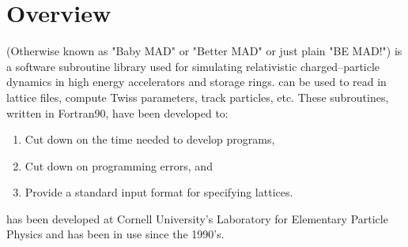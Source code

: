 \section*{Overview}

\bmad (Otherwise known as "Baby MAD" or "Better MAD" or just plain "BE MAD!")
is a software subroutine library used for simulating 
relativistic charged--particle dynamics in high energy accelerators
and storage rings. \bmad can be used to read in lattice files, compute 
Twiss parameters, track particles, etc. 
These subroutines, written in  Fortran90, have been developed to:
\begin{enumerate}
\item Cut down on the time needed to develop programs,
\item Cut down on programming errors, and
\item Provide a standard input format for specifying lattices.
\end{enumerate}
\bmad has been developed at Cornell University's Laboratory for Elementary
Particle Physics and has been in use since the 1990's.
\vfill
\break
